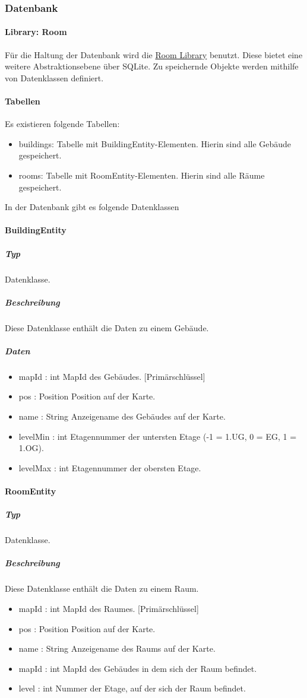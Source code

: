 \subsubsection{Datenbank}
\paragraph{Library: Room}
Für die Haltung der Datenbank wird die \href{https://developer.android.com/training/data-storage/room}
{Room Library} benutzt. Diese bietet eine weitere Abstraktionsebene über SQLite.
Zu speichernde Objekte werden mithilfe von Datenklassen definiert.

\paragraph{Tabellen}
Es existieren folgende Tabellen:
\begin{itemize}
    \item buildings: Tabelle mit BuildingEntity-Elementen. Hierin sind alle Gebäude gespeichert.
    \item rooms: Tabelle mit RoomEntity-Elementen. Hierin sind alle Räume gespeichert.
\end{itemize}

In der Datenbank gibt es folgende Datenklassen

\paragraph{BuildingEntity}
\subparagraph*{Typ}
Datenklasse.
\subparagraph*{Beschreibung}
Diese Datenklasse enthält die Daten zu einem Gebäude.
\subparagraph*{Daten}
\begin{itemize}
    \item mapId : int MapId des Gebäudes. [Primärschlüssel]
    \item pos : Position Position auf der Karte.
    \item name : String Anzeigename des Gebäudes auf der Karte.
    \item levelMin : int Etagennummer der untersten Etage (-1 = 1.UG, 0 = EG, 1 = 1.OG).
    \item levelMax : int Etagennummer der obersten Etage.
\end{itemize}

\paragraph{RoomEntity}
\subparagraph*{Typ}
Datenklasse.
\subparagraph*{Beschreibung}
Diese Datenklasse enthält die Daten zu einem Raum.
\begin{itemize}
    \item mapId : int MapId des Raumes. [Primärschlüssel]
    \item pos : Position Position auf der Karte.
    \item name : String Anzeigename des Raums auf der Karte.
    \item mapId : int MapId des Gebäudes in dem sich der Raum befindet.
    \item level : int Nummer der Etage, auf der sich der Raum befindet.
\end{itemize}

